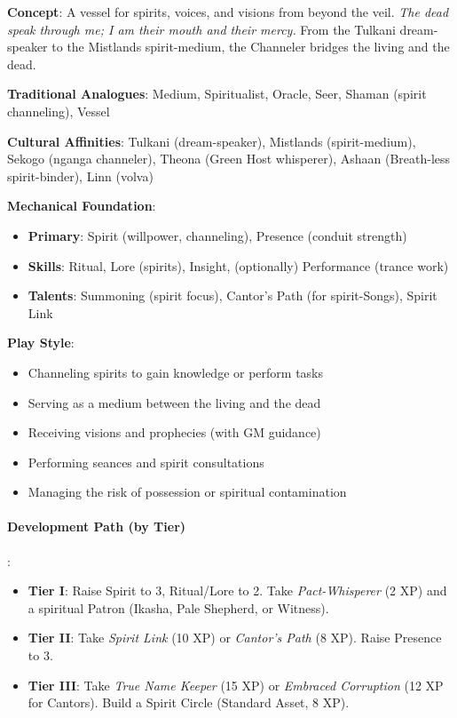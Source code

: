 \textbf{Concept}: A vessel for spirits, voices, and visions from beyond the veil. \emph{The dead speak through me; I am their mouth and their mercy.} From the Tulkani dream-speaker to the Mistlands spirit-medium, the Channeler bridges the living and the dead.

\textbf{Traditional Analogues}: Medium, Spiritualist, Oracle, Seer, Shaman (spirit channeling), Vessel

\textbf{Cultural Affinities}: Tulkani (dream-speaker), Mistlands (spirit-medium), Sekogo (nganga channeler), Theona (Green Host whisperer), Ashaan (Breath-less spirit-binder), Linn (volva)

\textbf{Mechanical Foundation}:
\begin{itemize}
\item \textbf{Primary}: Spirit (willpower, channeling), Presence (conduit strength)
\item \textbf{Skills}: Ritual, Lore (spirits), Insight, (optionally) Performance (trance work)
\item \textbf{Talents}: Summoning (spirit focus), Cantor's Path (for spirit-Songs), Spirit Link
\end{itemize}

\textbf{Play Style}:
\begin{itemize}
\item Channeling spirits to gain knowledge or perform tasks
\item Serving as a medium between the living and the dead
\item Receiving visions and prophecies (with GM guidance)
\item Performing seances and spirit consultations
\item Managing the risk of possession or spiritual contamination
\end{itemize}

\paragraph{Development Path (by Tier)}:
\begin{itemize}
\item \textbf{Tier I}: Raise Spirit to 3, Ritual/Lore to 2. Take \emph{Pact-Whisperer} (2 XP) and a spiritual Patron (Ikasha, Pale Shepherd, or Witness).
\item \textbf{Tier II}: Take \emph{Spirit Link} (10 XP) or \emph{Cantor's Path} (8 XP). Raise Presence to 3.
\item \textbf{Tier III}: Take \emph{True Name Keeper} (15 XP) or \emph{Embraced Corruption} (12 XP for Cantors). Build a Spirit Circle (Standard Asset, 8 XP).
\end{itemize}


